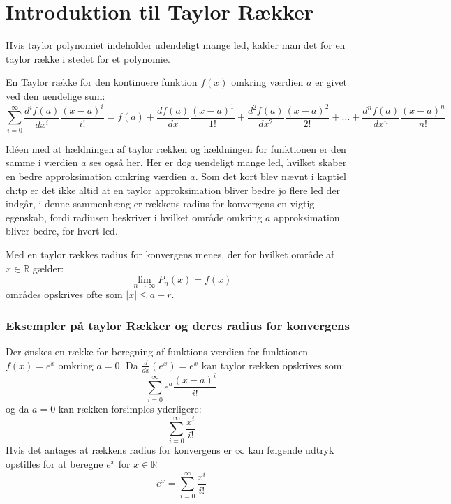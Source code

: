 \chapter{Introduktion til Taylor Rækker}
\label{ch:ts}
Hvis taylor polynomiet indeholder udendeligt mange led, 
kalder man det for en taylor række i stedet for et polynomie. 
\begin{defn}
    En Taylor række for den kontinuere funktion $f(x)$ omkring værdien $a$ er givet ved den uendelige sum:
    \[
        \sum^{\infty}_{i=0} \frac{d^i f(a)}{dx^i} \frac{(x-a)^{i}}{i!} = f(a) + \frac{df(a)}{dx} \frac{(x-a)^{1}}{1!} + 
        \frac{d^{2}f(a)}{dx^{2}} \frac{(x-a)^{2}}{2!} + \ldots + \frac{d^{n} f(a)}{dx^{n}} \frac{(x-a)^n}{n!}
    \]
\end{defn}
\label{def:taylorrække}
Idéen med at hældningen af taylor rækken og hældningen for funktionen er den samme i værdien $a$ ses også her.
Her er dog uendeligt mange led, hvilket skaber en bedre approksimation omkring værdien $a$. 
Som det kort blev nævnt i kaptiel \refname{ch:tp} er det ikke altid at en taylor approksimation bliver bedre
jo flere led der indgår, i denne sammenhæng er rækkens radius for konvergens en vigtig egenskab,
fordi radiusen beskriver i hvilket område omkring $a$ approksimation bliver bedre, for hvert led.  %
\begin{defn}
    Med en taylor rækkes radius for konvergens menes, der for hvilket område af $x \in \mathbb{R}$ gælder:
    \[
        \lim_{n \rightarrow \infty} P_n(x) = f(x)
    \]
    områdes opskrives ofte som $|x| \le a + r$.
\end{defn}


\subsection*{Eksempler på taylor Rækker og deres radius for konvergens} 
Der ønskes en række for beregning af funktions værdien for funktionen $f(x) = e^x$ omkring $a = 0$.
Da $\frac{d}{dx}(e^x) = e^x$ kan taylor rækken opskrives som:
\[
\sum^\infty_{i = 0} e^a \frac{(x-a)^i}{i!}
\]
og da $a = 0$ kan rækken forsimples yderligere:
\[
\sum^\infty_{i = 0} \frac{x^i}{i!}  
\]
Hvis det antages at rækkens radius for konvergens er $\infty$ kan følgende udtryk opstilles for at beregne $e^x$ for $x \in \mathbb{R}$
\[
e^x = \sum^\infty_{i = 0} \frac{x^i}{i!}  
\]
